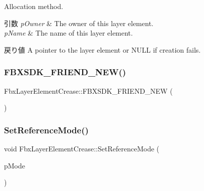 Allocation method. 
\begin{DoxyParams}{引数}
{\em p\+Owner} & The owner of this layer element. \\
\hline
{\em p\+Name} & The name of this layer element. \\
\hline
\end{DoxyParams}
\begin{DoxyReturn}{戻り値}
A pointer to the layer element or {\ttfamily N\+U\+LL} if creation fails. 
\end{DoxyReturn}
\mbox{\label{class_fbx_layer_element_crease_a5b85454e2b22d8349a2134d00e7bdaea}} 
\subsubsection{\texorpdfstring{F\+B\+X\+S\+D\+K\+\_\+\+F\+R\+I\+E\+N\+D\+\_\+\+N\+E\+W()}{FBXSDK\_FRIEND\_NEW()}}
{\footnotesize\ttfamily Fbx\+Layer\+Element\+Crease\+::\+F\+B\+X\+S\+D\+K\+\_\+\+F\+R\+I\+E\+N\+D\+\_\+\+N\+EW (\begin{DoxyParamCaption}{ }\end{DoxyParamCaption})}

\mbox{\label{class_fbx_layer_element_crease_aa670c1f3cfbcef29d1080b6c9c4e8e34}} 
\subsubsection{\texorpdfstring{Set\+Reference\+Mode()}{SetReferenceMode()}}
{\footnotesize\ttfamily void Fbx\+Layer\+Element\+Crease\+::\+Set\+Reference\+Mode (\begin{DoxyParamCaption}\item[{\hyperlink{class_fbx_layer_element_a00f04654580ca9b2f5d292c11abd83fc}{Fbx\+Layer\+Element\+::\+E\+Reference\+Mode}}]{p\+Mode }\end{DoxyParamCaption})}


